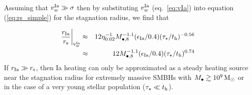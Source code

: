 \documentclass[usenatbib,fleqn]{mn2e}
\begin{document}
Assuming that $v_{w}^{\rm Ia} \gg \sigma$ then by substituting
$v_{w}^{\rm Ia}$ (eq.~\ref{eq:vIa}) into equation (\ref{eq:rs_simple})
for the stagnation radius, we find that

\begin{eqnarray}
  \left.\frac{r_{\rm Ia}}{r_{\rm s}}\right|_{\rm v_{w}^{\rm Ia}}
  &\approx& 12\eta_{0.02}^{-1} M_{\bullet,8}^{-1.1}(\epsilon_{\rm
    Ia}/0.4) (\tau_{\star}/t_{\rm h})^{-0.56} \nonumber \\
  &\approx& 12 M_{\bullet,8}^{-1.1}(\epsilon_{\rm Ia}/0.4) (\tau_{\star}/t_{\rm h})^{0.74}
\label{eq:rIars}
\end{eqnarray}
If $r_{\rm Ia} \gg r_{\rm s}$, then Ia heating can only be
approximated as a steady heating source near the stagnation radius for
extremely massive SMBHs with $M_{\bullet} \gtrsim 10^9 \,{\rm M_\odot}$ or in
the case of a very young stellar population ($\tau_{\star} \ll t_{\rm
h}$).  

\end{document}
